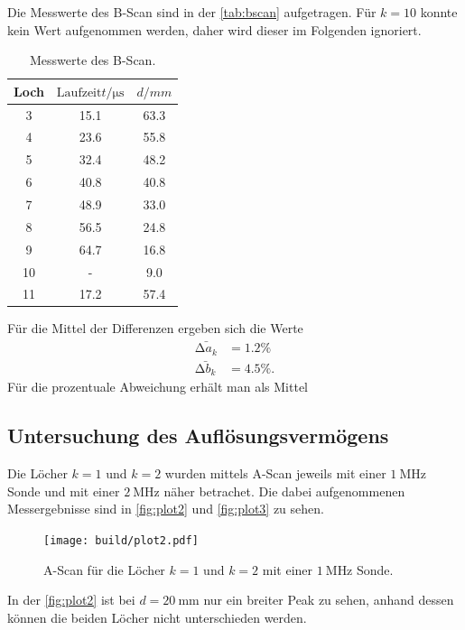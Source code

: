 Die Messwerte des B-Scan sind in der \autoref{tab:bscan} aufgetragen. Für $k =10$ konnte kein Wert aufgenommen werden, daher wird dieser
im Folgenden ignoriert.
\begin{table}[H]
    \centering
    \caption{Messwerte des B-Scan.}
    \label{tab:bscan}
\begin{tabular}{c c c}
\toprule
Loch & $\text{Laufzeit} t / \si{\micro\second} $& $ d/ \si{mm}$\\
\midrule
 3 & 15.1 & 63.3 \\
 4 & 23.6 & 55.8 \\
 5 & 32.4 & 48.2 \\
 6 & 40.8 & 40.8 \\
 7 & 48.9 & 33.0 \\
 8 & 56.5 & 24.8 \\
 9 & 64.7 & 16.8 \\
10 & - &  9.0 \\
11 & 17.2 & 57.4 \\
\bottomrule
\end{tabular}
\end{table}

Für die Mittel der Differenzen ergeben sich die Werte
\begin{align*}
\bar{\increment a_k} &= 1.2 \% \\
\bar{\increment b_k} &= 4.5 \%.
\end{align*}
Für die prozentuale Abweichung erhält man als Mittel


\subsection{Untersuchung des Auflösungsvermögens} %
\label{sec:Untersuchung des Auslösungsverfahrens}

Die Löcher $k = 1$ und $k = 2$ wurden mittels A-Scan jeweils mit einer $\SI{1}{\mega\hertz}$ Sonde und mit einer
$\SI{2}{\mega\hertz}$ näher betrachet. Die dabei aufgenommenen Messergebnisse sind in \autoref{fig:plot2} und \autoref{fig:plot3}
zu sehen.

\begin{figure}[H]
	\texttt{[image: build/plot2.pdf]}
	\captionsetup{width=0.765\linewidth}
	\caption{A-Scan für die Löcher $k = 1$ und $k = 2$ mit einer $\SI{1}{\mega\hertz}$ Sonde.}
	\label{fig:plot2}
\end{figure}
In der \autoref{fig:plot2} ist bei $d = \SI{20}{\milli\meter}$ nur ein breiter Peak zu sehen, anhand dessen können die beiden Löcher nicht unterschieden werden.

